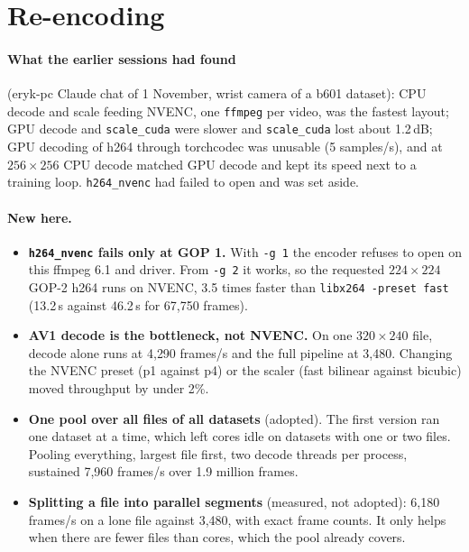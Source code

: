 \documentclass[10pt]{article}
\newcommand{\code}[1]{\texttt{\small #1}}
\begin{document}
\section{Re-encoding}
\paragraph{What the earlier sessions had found} (eryk-pc Claude chat of 1 November, wrist
camera of a b601 dataset): CPU decode and scale feeding NVENC, one \code{ffmpeg} per video,
was the fastest layout; GPU decode and \code{scale\_cuda} were slower and \code{scale\_cuda}
lost about 1.2\,dB; GPU decoding of h264 through torchcodec was unusable (5 samples/s), and
at $256{\times}256$ CPU decode matched GPU decode and kept its speed next to a training
loop. \code{h264\_nvenc} had failed to open and was set aside.

\paragraph{New here.}
\begin{itemize}
\item \textbf{\code{h264\_nvenc} fails only at GOP 1.} With \code{-g 1} the encoder refuses to
  open on this ffmpeg 6.1 and driver. From \code{-g 2} it works, so the requested
  $224{\times}224$ GOP-2 h264 runs on NVENC, 3.5 times faster than \code{libx264 -preset fast}
  (13.2\,s against 46.2\,s for 67{,}750 frames).
\item \textbf{AV1 decode is the bottleneck, not NVENC.} On one $320{\times}240$ file, decode
  alone runs at 4{,}290 frames/s and the full pipeline at 3{,}480. Changing the NVENC preset
  (p1 against p4) or the scaler (fast bilinear against bicubic) moved throughput by under
  2\%.
\item \textbf{One pool over all files of all datasets} (adopted). The first version ran
  one dataset at a time, which left cores idle on datasets with one or two files. Pooling
  everything, largest file first, two decode threads per process, sustained 7{,}960 frames/s
  over 1.9 million frames.
\item \textbf{Splitting a file into parallel segments} (measured, not adopted): 6{,}180
  frames/s on a lone file against 3{,}480, with exact frame counts. It only helps when there
  are fewer files than cores, which the pool already covers.
\end{itemize}
\end{document}
